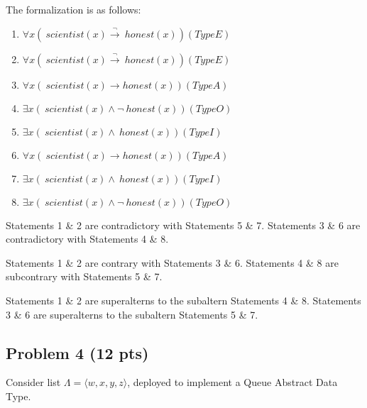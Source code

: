 \documentclass[12pt]{article}
\begin{document}
\noindent The formalization is as follows:

\begin{enumerate}
\item $\forall x (~scientist(x) \xrightarrow \neg ~honest(x)) (Type E)$
\item $\forall x (~scientist(x) \xrightarrow \neg ~honest(x)) (Type E)$
\item $\forall x (~scientist(x) \xrightarrow ~honest(x)) (Type A)$
\item $\exists x (~scientist(x) \wedge \neg ~honest(x)) (Type O)$
\item $\exists x (~scientist(x) \wedge ~honest(x)) (Type I)$
\item $\forall x (~scientist(x) \xrightarrow ~honest(x)) (Type A)$
\item $\exists x (~scientist(x) \wedge ~honest(x)) (Type I)$
\item $\exists x (~scientist(x) \wedge \neg ~honest(x)) (Type O)$
\end{enumerate}

\noindent Statements 1 \& 2 are contradictory with Statements 5 \& 7. Statements 3 \& 6 are contradictory with Statements 4 \& 8. 

\noindent Statements 1 \& 2 are contrary with Statements 3 \& 6. Statements 4 \& 8 are subcontrary with Statements 5 \& 7.

\noindent Statements 1 \& 2 are superalterns to the subaltern Statements 4 \& 8. Statements 3 \& 6 are superalterns to the subaltern Statements 5 \& 7.





\newpage

\subsection{Problem 4 (12 pts)}

Consider list $\Lambda = \langle w, x, y, z \rangle$, deployed to implement a Queue Abstract Data Type.
\end{document}
